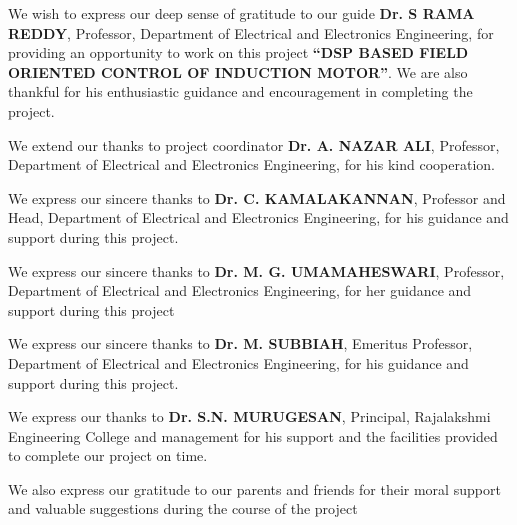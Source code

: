 




\vspace{1em} %

We wish to express our deep sense of gratitude to our guide \textbf{Dr. S RAMA REDDY}, Professor, Department of Electrical and Electronics Engineering, for providing an opportunity to work on this project \textbf{``DSP BASED FIELD ORIENTED CONTROL OF INDUCTION MOTOR''}. We are also thankful for his enthusiastic guidance and encouragement in completing the project.

\vspace{0.5em} %
We extend our thanks to project coordinator \textbf{Dr. A. NAZAR ALI}, Professor, Department of Electrical and Electronics Engineering, for his kind cooperation.

\vspace{0.5em} %
We express our sincere thanks to \textbf{Dr. C. KAMALAKANNAN}, Professor and Head, Department of Electrical and Electronics Engineering, for his guidance and support during this project.

\vspace{0.5em} %
We express our sincere thanks to \textbf{Dr. M. G. UMAMAHESWARI}, Professor, Department of Electrical and Electronics Engineering, for her guidance and support during this project

\vspace{0.5em} %
We express our sincere thanks to \textbf{Dr. M. SUBBIAH}, Emeritus Professor, Department of Electrical and Electronics Engineering, for his guidance and support during this project.

\vspace{0.5em} %
We express our thanks to \textbf{Dr. S.N. MURUGESAN}, Principal, Rajalakshmi Engineering College and management for his support and the facilities provided to complete our project on time.

\vspace{0.5em} %
We also express our gratitude to our parents and friends for their moral support and valuable suggestions during the course of the project


\newpage